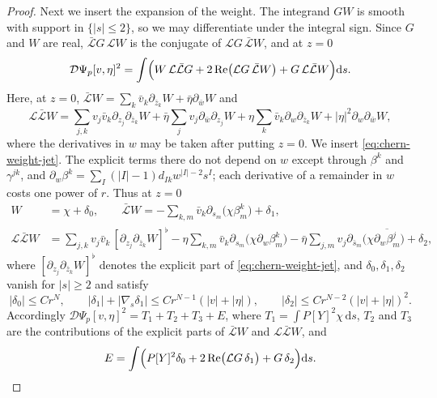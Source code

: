 \begin{proof}
Next we insert the expansion of the weight. The integrand $GW$ is smooth with support in $\{|s|\leq2\}$, so we may differentiate under the integral sign. Since $G$ and $W$ are real, $\bar{\mathcal L}G\,\mathcal LW$ is the conjugate of $\mathcal LG\,\bar{\mathcal L}W$, and at $z=0$
\[
 \mathcal D\Psi_p[v,\eta]^2=\int\Bigl(W\,\mathcal L\bar{\mathcal L}G+2\operatorname{Re}\bigl(\mathcal LG\,\bar{\mathcal L}W\bigr)+G\,\mathcal L\bar{\mathcal L}W\Bigr)\mathrm ds.
\]
Here, at $z=0$, $\bar{\mathcal L}W=\sum_k\bar v_k\partial_{\bar z_k}W+\bar\eta\partial_{\bar w}W$ and
\[
 \mathcal L\bar{\mathcal L}W=\sum_{j,k}v_j\bar v_k\partial_{z_j}\partial_{\bar z_k}W+\bar\eta\sum_jv_j\partial_{\bar w}\partial_{z_j}W+\eta\sum_k\bar v_k\partial_w\partial_{\bar z_k}W+|\eta|^2\partial_w\partial_{\bar w}W,
\]
where the derivatives in $w$ may be taken after putting $z=0$. We insert \eqref{eq:chern-weight-jet}. The explicit terms there do not depend on $w$ except through $\beta^k$ and $\gamma^{jk}$, and $\partial_w\beta^k=\sum_I(|I|-1)d_{Ik}w^{|I|-2}s^I$; each derivative of a remainder in $w$ costs one power of $r$. Thus at $z=0$
\begin{align*}
 W&=\chi+\delta_0,\qquad \bar{\mathcal L}W=-\sum_{k,m}\bar v_k\partial_{s_m}\bigl(\chi\beta^k_m\bigr)+\delta_1,\\
 \mathcal L\bar{\mathcal L}W&=\sum_{j,k}v_j\bar v_k\,[\partial_{z_j}\partial_{\bar z_k}W]^\flat-\eta\sum_{k,m}\bar v_k\partial_{s_m}\bigl(\chi\partial_w\beta^k_m\bigr)-\bar\eta\sum_{j,m}v_j\partial_{\bar s_m}\bigl(\chi\overline{\partial_w\beta^j_m}\bigr)+\delta_2,
\end{align*}
where $[\partial_{z_j}\partial_{\bar z_k}W]^\flat$ denotes the explicit part of \eqref{eq:chern-weight-jet}, and $\delta_0,\delta_1,\delta_2$ vanish for $|s|\geq2$ and satisfy
\begin{equation}\label{eq:chern-weight-remainders}
 |\delta_0|\leq Cr^N,\qquad |\delta_1|+|\nabla_s\delta_1|\leq Cr^{N-1}(|v|+|\eta|),\qquad |\delta_2|\leq Cr^{N-2}(|v|+|\eta|)^2.
\end{equation}
Accordingly $\mathcal D\Psi_p[v,\eta]^2=T_1+T_2+T_3+E$, where $T_1=\int P[Y]^2\chi\,\mathrm ds$, $T_2$ and $T_3$ are the contributions of the explicit parts of $\bar{\mathcal L}W$ and $\mathcal L\bar{\mathcal L}W$, and
\begin{equation}\label{eq:chern-kernel-remainder}
 E=\int\Bigl(P[Y]^2\delta_0+2\operatorname{Re}\bigl(\mathcal LG\,\delta_1\bigr)+G\,\delta_2\Bigr)\mathrm ds.
\end{equation}


\end{proof}
